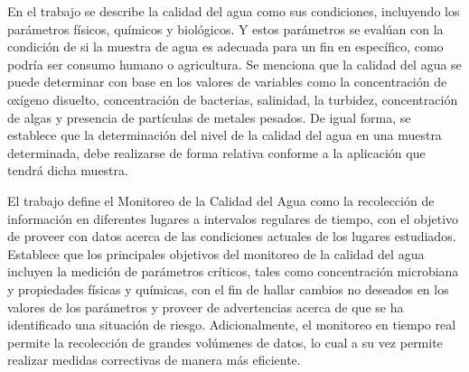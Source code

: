 En el trabajo \cite{sanctuary_what_nodate} se describe la calidad del agua como 
sus condiciones, incluyendo los parámetros físicos, químicos y biológicos. Y estos 
parámetros se evalúan con la condición de si la muestra de agua es adecuada 
para un fin en específico, como podría ser consumo humano o agricultura. Se menciona 
que la calidad del agua se puede determinar con base en los valores de variables como
la concentración de oxígeno disuelto, concentración de bacterias, salinidad,
la turbidez, concentración de algas y presencia de partículas de metales pesados. De
igual forma, se establece que la determinación del nivel de la calidad del agua 
en una muestra determinada, debe realizarse de forma relativa conforme a la 
aplicación que tendrá dicha muestra.

El trabajo \cite{geetha_internet_2016} define el Monitoreo de la Calidad del Agua
como la recolección de información en diferentes lugares a intervalos regulares
de tiempo, con el objetivo de proveer con datos acerca de las condiciones actuales 
de los lugares estudiados. Establece que los principales objetivos del monitoreo 
de la calidad del agua incluyen la medición de parámetros críticos, tales como 
concentración microbiana y propiedades físicas y químicas, con el fin de hallar
cambios no deseados en los valores de los parámetros y proveer de advertencias 
acerca de que se ha identificado una situación de riesgo. Adicionalmente, el 
monitoreo en tiempo real permite la recolección de grandes volúmenes de datos, lo 
cual a su vez permite realizar medidas correctivas de manera más eficiente. 


